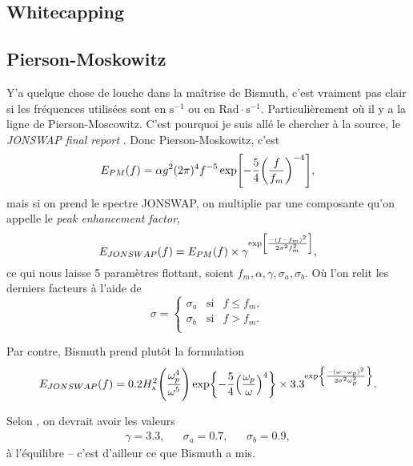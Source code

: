 \documentclass[10pt]{article}
\numberwithin{equation}{section}
\begin{document}
\subsection{Whitecapping}
\label{sec:org25601d5}

\subsection{Pierson-Moskowitz}
\label{sec:orgaccf29c}

Y'a quelque chose de louche dans la maîtrise de Bismuth, c'est vraiment pas clair si les fréquences utilisées sont en \(\mathrm{s}^{-1}\) ou en \(\mathrm{Rad}\cdot\mathrm{s}^{-1}\).
Particulièrement où il y a la ligne de Pierson-Moscowitz.
C'est pourquoi je suis allé le chercher à la source, le \emph{JONSWAP final report} \autocite{hasselmann1973measurements}.
Donc Pierson-Moskowitz, c'est
\begin{equation}
   E_{PM}(f) = \alpha g^2 (2\pi)^4 f^{-5} \exp[- \frac{5}{4} \qty(\frac{f}{f_m})^{-4}],
\end{equation}
mais si on prend le spectre JONSWAP, on multiplie par une composante qu'on appelle le \emph{peak enhancement factor},
\begin{equation}
   E_{JONSWAP}(f) = E_{PM}(f)\times\gamma^{\huge\exp[ \frac{-(f-f_m)^2}{2\sigma^2f_m^2}]},
\end{equation}
ce qui nous laisse 5 paramètres flottant, soient \(f_m, \alpha, \gamma, \sigma_a, \sigma_b\).
Où l'on relit les derniers facteurs à l'aide de
\begin{equation}
   \sigma = \left\lbrace\begin{matrix}
       \sigma_a & \mathrm{si} & f \leq f_m,\\
       \sigma_b & \mathrm{si} & f > f_m.\\
   \end{matrix}
  \right.
\end{equation}

Par contre, Bismuth prend plutôt la formulation
\begin{equation}
   E_{JONSWAP}(f) = 0.2H_s^2 \qty(\frac{\omega_p^4}{\omega^5}) \exp{-\frac{5}{4}\qty(\frac{\omega_p}{\omega})^4} \times 3.3^{\exp{\frac{-(\omega-\omega_p)^2}{2\sigma^2 \omega_p^2}}}.
\end{equation}

Selon \Textcite{hasselmann1973measurements}, on devrait avoir les valeurs
\begin{align}
   &&\gamma = 3.3, && \sigma_a = 0.7, && \sigma_b = 0.9, &&
\end{align}
à l'équilibre -- c'est d'ailleur ce que Bismuth a mis.\bigskip
\end{document}
